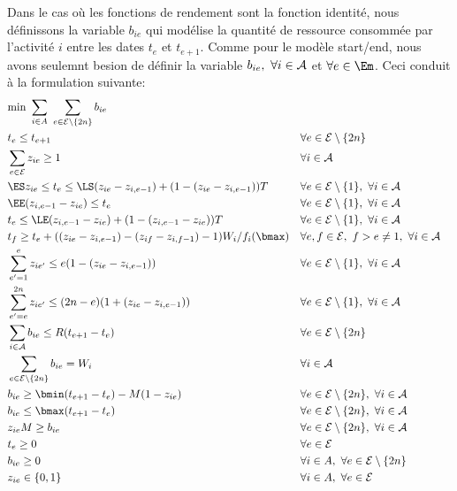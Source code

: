 Dans le cas où les fonctions de rendement sont la fonction identité,
nous définissons la variable $b_{ie}$ qui modélise la quantité de
ressource consommée par l'activité $i$ entre les dates $t_e$ et
$t_{e+1}$. Comme pour le modèle start/end, nous avons seulemnt besion
de définir la variable $b_{ie},\ \forall i \in {\cal A}$ et $\forall e \in
\Em$. Ceci conduit à la formulation suivante: 
{\small
\begin{align}
& \text{min } \sum_{i\in A}\ \sum_{e\in \E\setminus
    \{2n\}}b_{ie}
 \label{obj_CECSP_OO}\\ 
&t_e \le t_{e+1} & &\forall e \in \E\setminus
 \{2n\} \label{ordre_CECSP_OO}\\
&\sum_{e \in \E} z_{ie} \ge 1 & & \forall i \in {\cal
   A}\label{start_CECSP_OO}\\
& \ES z_{ie}\le t_e \le \LS(z_{ie}-z_{i,e-1})+(1-(z_{ie}-z_{i,e-1}))T
 & & \forall e \in \E\setminus \{1\},\ \forall i \in {\cal
   A}\label{twx_CECSP_OO}\\
&\EE(z_{i,e-1}-z_{ie})\le t_e & & \forall e \in \E\setminus
 \{1\},\ \forall i \in \A\label{twy1_CECSP_OO}\\
&t_e \le \LE(z_{i,e-1}-z_{ie})+(1-(z_{i,e-1}-z_{ie}))T & & \forall e
 \in \E\setminus \{1\},\ \forall i \in {\cal
   A}\label{twy2_CECSP_OO}\\
&t_f\ge t_e +((z_{ie}-z_{i,e-1})-(z_{if}-z_{i,f-1})-1)W_i/f_i(\bmax) &
 & \forall e,f \in \E,\ f>e\neq 1,\ \forall i \in {\cal
   A} \label{dur_CECSP_OO}\\
&\sum_{e'=1}^{e} z_{ie'} \le e(1-(z_{ie}-z_{i,e-1})) & & \forall e \in
       \E\setminus \{1\},\ \forall i \in \A
\label{preem1_CECSP_OO}\\
&\sum_{e'=e}^{2n} z_{ie'} \le (2n-e)(1+(z_{ie}-z_{i,e-1})) & & \forall
e \in \E\setminus \{1\},\ \forall i \in \A
\label{preem2_CECSP_OO}\\
&\sum_{i\in \A} b_{ie} \le R(t_{e+1}-t_e) & & \forall e \in
      \E\setminus \{2n\}\label{res_CECSP_OO}\\
&\sum_{e \in \E\setminus \{2n\}} b_{ie} = W_i & & \forall i \in
        \A\label{nrj_CECSP_OO}\\
&b_{ie} \ge \bmin(t_{e+1}-t_e) - M(1-z_{ie}) & & \forall e \in {\cal
  E}\setminus \{2n\}, \ \forall i \in \A\label{bmin_CECSP_OO}\\
&b_{ie} \le \bmax(t_{e+1}-t_e) & &\forall e \in \E\setminus
\{2n\},\ \forall i \in \A\label{bmax_CECSP_OO}\\
&z_{ie}M\ge b_{ie} & & \forall e\in \E\setminus \{2n\},
\ \forall i \in \A\label{res0_CECSP_OO}\\
&t_e \ge 0 & & \forall e \in \E \label{eq54}\\
& b_{ie} \ge 0 & & \forall i \in A,\ \forall e \in \E\setminus
\{2n\}
 \label{Bb_CECSP_OO}\\
&z_{ie} \in \{0,1\} & & \forall i \in A,\ \forall e \in {\cal
   E} \label{eq57}
\end{align}
}
